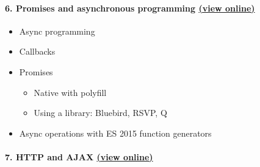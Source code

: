 \paragraph{\texorpdfstring{6. Promises and asynchronous programming
\href{https://rawgit.com/TelerikAcademy/JavaScript-Applications/master/06.\%20Promises\%20and\%20asynchronous\%20programming/slides/index.html}{(view
online)}}{6. Promises and asynchronous programming (view online)}}\label{promises-and-asynchronous-programming-view-online}

\begin{itemize}
\tightlist
\item
  Async programming
\item
  Callbacks
\item
  Promises

  \begin{itemize}
  \tightlist
  \item
    Native with polyfill
  \item
    Using a library: Bluebird, RSVP, Q
  \end{itemize}
\item
  Async operations with ES 2015 function generators
\end{itemize}

\paragraph{\texorpdfstring{7. HTTP and AJAX
\href{https://rawgit.com/TelerikAcademy/JavaScript-Applications/master/07.\%20HTTP\%20and\%20AJAX/slides/index.html\#/title}{(view
online)}}{7. HTTP and AJAX (view online)}}\label{http-and-ajax-view-online}

